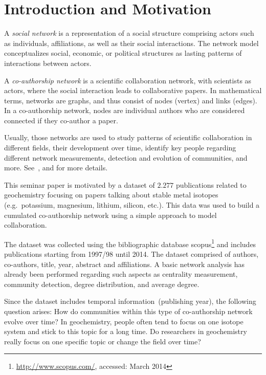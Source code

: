 \documentclass[runningheads,a4paper]{llncs}
\begin{document}
\section{Introduction and Motivation}
A \emph{social network} is a representation of a social structure comprising actors such as individuals, affiliations, as well as their social interactions.
The network model conceptualizes social, economic, or political structures as lasting patterns of interactions between actors.~\cite{wasserman1994social}

A \emph{co-authorship network} is a scientific collaboration network, with scientists as actors, where the social interaction leads to collaborative papers.
In mathematical terms, networks are graphs, and thus consist of nodes (vertex) and links (edges).
In a co-authorship network, nodes are individual authors who are considered connected if they co-author a paper.~\cite{newman2001structure}

Usually, those networks are used to study patterns of scientific collaboration in different fields, their development over time, identify key people regarding different network measurements, detection and evolution of communities, and more. See~\cite{barabasi2002evolution}, \cite{newman2001structure} and \cite{newman2004coauthorship} for more details.

This seminar paper is motivated by a dataset of $2.277$ publications related to geochemistry focusing on papers talking about stable metal isotopes (e.g.~potassium, magnesium, lithium, silicon, etc.). This data was used to build a cumulated co-authorship network using a simple approach to model collaboration.

The dataset was collected using the bibliographic database scopus\footnote{\url{http://www.scopus.com/}, accessed: March 2014} and includes publications starting from 1997/98 until 2014.
The dataset comprised of authors, co-authors, title, year, abstract and affiliations.
A basic network analysis has already been performed regarding such aspects as centrality measurement, community detection, degree distribution, and average degree.

Since the dataset includes temporal information~(publishing year), the following question arises: How do communities within this type of co-authorship network evolve over time? In geochemistry, people often tend to focus on one isotope system and stick to this topic for a long time. Do researchers in geochemistry really focus on one specific topic or change the field over time?
\end{document}
